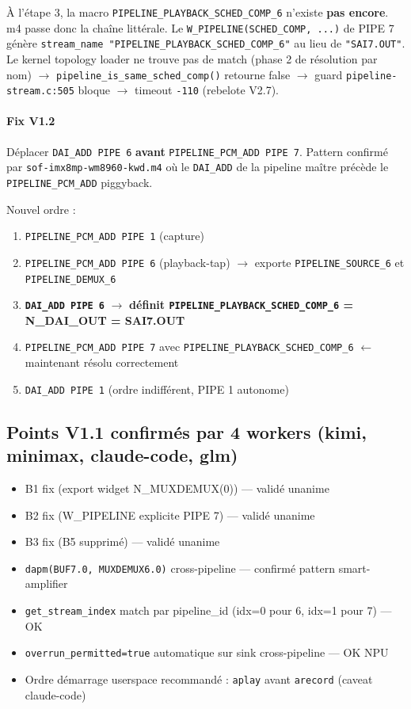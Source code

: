 \documentclass[11pt,a4paper]{article}
\begin{document}
À l'étape 3, la macro \texttt{PIPELINE\_PLAYBACK\_SCHED\_COMP\_6} n'existe \textbf{pas encore}. m4 passe donc la chaîne littérale. Le \texttt{W\_PIPELINE(SCHED\_COMP, ...)} de PIPE 7 génère \texttt{stream\_name "PIPELINE\_PLAYBACK\_SCHED\_COMP\_6"} au lieu de \texttt{"SAI7.OUT"}. Le kernel topology loader ne trouve pas de match (phase 2 de résolution par nom) $\to$ \texttt{pipeline\_is\_same\_sched\_comp()} retourne false $\to$ guard \texttt{pipeline-stream.c:505} bloque $\to$ timeout \texttt{-110} (rebelote V2.7).

\paragraph{Fix V1.2} Déplacer \texttt{DAI\_ADD PIPE 6} \textbf{avant} \texttt{PIPELINE\_PCM\_ADD PIPE 7}. Pattern confirmé par \texttt{sof-imx8mp-wm8960-kwd.m4} où le \texttt{DAI\_ADD} de la pipeline maître précède le \texttt{PIPELINE\_PCM\_ADD} piggyback.

Nouvel ordre :
\begin{enumerate}[leftmargin=*, itemsep=1pt]
  \item \texttt{PIPELINE\_PCM\_ADD PIPE 1} (capture)
  \item \texttt{PIPELINE\_PCM\_ADD PIPE 6} (playback-tap) $\to$ exporte \texttt{PIPELINE\_SOURCE\_6} et \texttt{PIPELINE\_DEMUX\_6}
  \item \textbf{\texttt{DAI\_ADD PIPE 6}} $\to$ \textbf{définit \texttt{PIPELINE\_PLAYBACK\_SCHED\_COMP\_6} = N\_DAI\_OUT = SAI7.OUT}
  \item \texttt{PIPELINE\_PCM\_ADD PIPE 7} avec \texttt{PIPELINE\_PLAYBACK\_SCHED\_COMP\_6} $\leftarrow$ maintenant résolu correctement
  \item \texttt{DAI\_ADD PIPE 1} (ordre indifférent, PIPE 1 autonome)
\end{enumerate}

\subsection{Points V1.1 confirmés par 4 workers (kimi, minimax, claude-code, glm)}

\begin{itemize}[leftmargin=*, itemsep=1pt]
  \item B1 fix (export widget N\_MUXDEMUX(0)) — validé unanime
  \item B2 fix (W\_PIPELINE explicite PIPE 7) — validé unanime
  \item B3 fix (B5 supprimé) — validé unanime
  \item \texttt{dapm(BUF7.0, MUXDEMUX6.0)} cross-pipeline — confirmé pattern smart-amplifier
  \item \texttt{get\_stream\_index} match par pipeline\_id (idx=0 pour 6, idx=1 pour 7) — OK
  \item \texttt{overrun\_permitted=true} automatique sur sink cross-pipeline — OK NPU
  \item Ordre démarrage userspace recommandé : \texttt{aplay} avant \texttt{arecord} (caveat claude-code)
\end{itemize}
\end{document}
